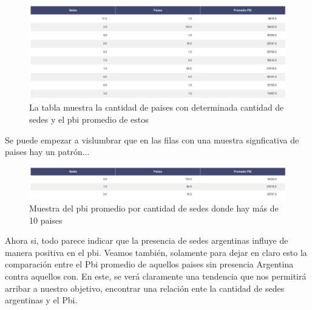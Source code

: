 \documentclass[10pt,a4paper]{article}
\begin{document}
\begin{figure}[h!]
  \centering
  \includegraphics[width=1\textwidth]{TABLAConclusion1.png}
  \caption{La tabla muestra la cantidad de paises con determinada cantidad de sedes y el pbi promedio de estos }
  \label{fig:Tabla Conclusion}
\end{figure} \vspace{0.1cm}

Se puede empezar a vislumbrar que en las filas con una muestra signficativa de paises hay un patrón... 

\begin{figure}[h!]
  \centering
  \includegraphics[width=1\textwidth]{TABLAConclusion.png}
  \caption{Muestra del pbi promedio por cantidad de sedes donde hay más de 10 paises }
  \label{fig:Tabla Conclusion}
\end{figure} \vspace{0.1cm}

Ahora si, todo parece indicar que la presencia de sedes argentinas influye de manera positiva en el pbi. Veamos también, solamente para dejar en claro esto la comparación entre el Pbi promedio de aquellos paises sin presencia Argentina contra aquellos con. En este, se verá claramente una tendencia que nos permitirá arribar a nuestro objetivo, encontrar una relación ente la cantidad de sedes argentinas y el Pbi.
\end{document}
